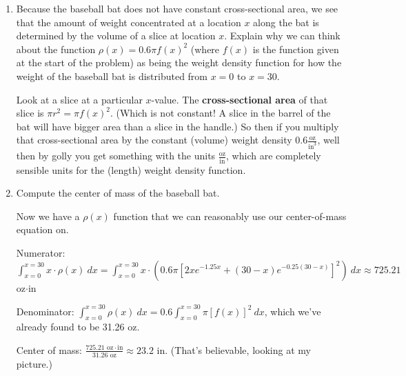 \begin{enumerate}[leftmargin=0pt]
\begin{enumerate}
    \begin{red}
    Check the units: since our constant weight density is given in $\frac{\text{oz}}{\text{in}^3}$, and since our volume we just computed was in $\text{in}^3$, we just have to multiply:
    \[0.6\frac{\text{oz}}{\text{in}^3} \cdot 52.1 \text{ in}^3 \approx 31.26 \text{ oz}. \]
    \end{red}
    
    \item Because the baseball bat does not have constant cross-sectional area, we see that the amount of weight concentrated at a location $x$ along the bat is determined by the volume of a slice at location $x$. Explain why we can think about the function $\rho(x) = 0.6 \pi f(x)^2$ (where $f(x)$ is the function given at the start of the problem) as being the weight density function for how the weight of the baseball bat is distributed from $x=0$ to $x=30$.
    
    \begin{red}
    Look at a slice at a particular $x$-value. The \textbf{cross-sectional area} of that slice is $\pi r^2 = \pi f(x)^2$. (Which is not constant! A slice in the barrel of the bat will have bigger area than a slice in the handle.) So then if you multiply that cross-sectional area by the constant (volume) weight density $0.6\frac{\text{oz}}{\text{in}^3}$, well then by golly you get something with the units $\frac{\text{oz}}{\text{in}}$, which are completely sensible units for the (length) weight density function.
    \end{red}
    
    \item Compute the center of mass of the baseball bat.
    
    \begin{red}
    Now we have a $\rho(x)$ function that we can reasonably use our center-of-mass equation on. 
    
    Numerator: $\int_{x=0}^{x=30} x\cdot\rho(x)\ dx = \int_{x=0}^{x=30} x\cdot \left(0.6\pi [2xe^{-1.25x} + (30-x) e^{-0.25(30-x)}]^2\right)\ dx \approx 725.21$ oz$\cdot$in
    
    Denominator: $\int_{x=0}^{x=30} \rho(x)\ dx = 0.6 \int_{x=0}^{x=30} \pi[f(x)]^2\ dx$, which we've already found to be 31.26 oz.
    
    Center of mass: $\frac{725.21 \text{ oz}\cdot\text{in}}{31.26\text{ oz}} \approx 23.2$ in. (That's believable, looking at my picture.)
    \end{red}
    
    
\end{enumerate}

\end{enumerate}
